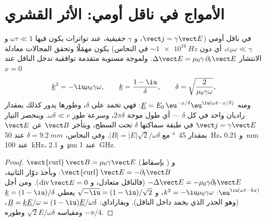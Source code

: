 \section{الأمواج في ناقل أومي: الأثر القشري}

\begin{theorem}\label{thm:b2:waves-in-media:skin}
في ناقل أومي ($\vect j = \gamma\vect E$، و $\gamma$ حقيقية، عند تواترات
يكون فيها $\omega\tau \ll 1$ و $\varepsilon_0\omega \ll \gamma$، أي دون $\sim\qty{1e16}{Hz}$ في
النحاس) يكون  مهمَلًا وتحقق المجالات
معادلة الانتشار $\Delta\vect E = \mu_0\gamma\,\partial_t\vect E$. ولموجة مستوية متقدمة توافقية تدخل
الناقل عند $x = 0$
\[
\underline k^2 = -\iu\mu_0\gamma\omega , \qquad \underline k = \frac{1 - \iu}\delta , \qquad
\delta = \sqrt{\frac2{\mu_0\gamma\omega}} ,
\]
ومنه $\underline E = E_0\,\eu^{-x/\delta}\eu^{\iu(\omega t - x/\delta)}$: فهي تخمد
على \emph{} $\delta$، وطورها يدور كذلك بمقدار راديان
واحد في كل $\delta$ --- أي طول موجة $2\pi\delta$، وسرعة طور $\omega\delta \ll
c$. وينحصر التيار $\vect j = \gamma\vect E$ في طبقة سماكتها
$\delta$ تحت السطح، ويتأخر $\vect B$ عن $\vect E$ بمقدار \qty{45}{\degree} مع
$|B| = |E|\sqrt2/\omega\delta$. وفي النحاس، $\delta = \qty{9.2}{mm}$ عند \qty{50}{Hz}،
و \qty{0.21}{mm} عند \qty{100}{kHz}، و \qty{2.1}{\micro m} عند \qty{1}{GHz}.
\end{theorem}

\begin{proof}
$\operatorname{\vect{curl}}\vect B = \mu_0\gamma\vect E$ (بإسقاط ) و
$\operatorname{\vect{curl}}\vect E = -\partial_t\vect B$: وبأخذ دوّار الثانية،
$-\Delta\vect E = -\mu_0\gamma\partial_t\vect E$ (فالناقل متعادل، و $\operatorname{div}
\vect E = 0$). ومن أجل $\eu^{\iu(\omega t - kx)}$: $k^2 = -\iu\mu_0\gamma\omega$، و
$\sqrt{-\iu} = (1 - \iu)/\sqrt2$ يعطي $\underline k = (1 - \iu)/\delta$ (وهو الجذر الذي
يخمد داخل الناقل). وبفاراداي: $\underline B = \underline k\underline E/\omega = (1 - \iu)
\underline E/\omega\delta$، ومقياسه $\sqrt2E/\omega\delta$ وطوره $-\pi/4$.
\end{proof}

